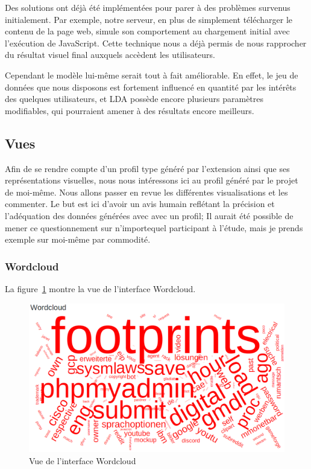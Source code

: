 				Des solutions ont déjà été implémentées pour parer à des problèmes survenus initialement. Par exemple, notre serveur, en plus de simplement télécharger le contenu de la page web, simule son comportement au chargement initial avec l'exécution de JavaScript. Cette technique nous a déjà permis de nous rapprocher du résultat visuel final auxquels accèdent les utilisateurs.

			Cependant le modèle lui-même serait tout à fait améliorable. En effet, le jeu de données que nous disposons est fortement influencé en quantité par les intérêts des quelques utilisateurs, et LDA possède encore plusieurs paramètres modifiables, qui pourraient amener à des résultats encore meilleurs.

	\subsection{Vues}

		Afin de se rendre compte d'un profil type généré par l'extension ainsi que ses représentations visuelles, nous nous intéressons ici au profil généré par le projet de moi-même. Nous allons passer en revue les différentes visualisations et les commenter. Le but est ici d'avoir un avis humain reflétant la précision et l'adéquation des données générées avec avec un profil; Il aurait été possible de mener ce questionnement sur n'importequel participant à l'étude, mais je prends exemple sur moi-même par commodité.

		\subsubsection{Wordcloud}

		La figure~\ref{critique-wordcloud} montre la vue de l'interface Wordcloud.

		\begin{figure}[!h]
			\centering
			\includegraphics[width=1\textwidth]{images/results/critique-wordcloud}
			\caption{Vue de l'interface Wordcloud}
			\label{critique-wordcloud}
		\end{figure}

